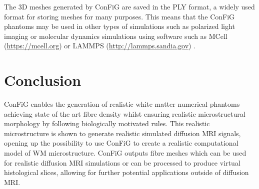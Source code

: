 The 3D meshes generated by \ac{ConFiG} are saved in the PLY format, a widely used format for storing meshes for many purposes. This means that the \ac{ConFiG} phantoms may be used in other types of simulations such as polarized light imaging \cite{Matuschke2019,Menzel2015} or molecular dynamics simulations using software such as MCell (\url{https://mcell.org}) \cite{Kerr2008a,Stiles2001,Stiles1996} or LAMMPS (\url{http://lammps.sandia.gov}) \cite{Plimpton1997}.

\section{Conclusion}
\label{sec:config_conclusion}
ConFiG enables the generation of realistic white matter numerical phantoms achieving state of the art fibre density whilst ensuring realistic microstructural morphology by following biologically motivated rules. This realistic microstructure is shown to generate realistic simulated diffusion \ac{MRI} signals, opening up the possibility to use \ac{ConFiG} to create a realistic computational model of \ac{WM} microstructure.
ConFiG outputs fibre meshes which can be used for realistic diffusion \ac{MRI} simulations or can be processed to produce virtual histological slices, allowing for further potential applications outside of diffusion \ac{MRI}.

